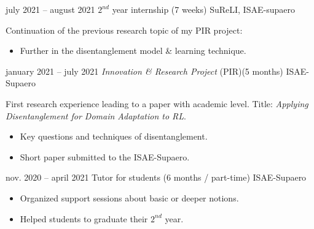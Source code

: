 \documentclass[
    a4paper,
]{fortysecondscv}
\begin{document}
\begin{cvtable}[4]
{                }
            \cvitem
                {july 2021 -- august 2021}
                {$2^{nd}$ year internship \newline (7 weeks)}
                {SuReLI, ISAE-supaero}
                {
                    Continuation of the previous research topic of my PIR project:
                    \begin{itemize}
                        \item Further in the disentanglement model \& learning technique.
                    \end{itemize}
                }
            \cvitem
                {january 2021 -- july 2021}
                {\textit{Innovation \& Research Project} (PIR)\newline (5 months)}
                {ISAE-Supaero}
                {
                    First research experience leading to a paper with academic level.\newline
                    Title: \textit{Applying Disentanglement for Domain Adaptation to RL}.
                    \begin{itemize}
                        \item Key questions and techniques of disentanglement.
                        \item Short paper submitted to the ISAE-Supaero.
                    \end{itemize}
                }
            \cvitem
                {nov. 2020 -- april 2021}
                {Tutor for students \newline (6 months / part-time)}
                {ISAE-Supaero}
                {
                    \begin{itemize}
                        \item Organized support sessions about basic or deeper notions.
                        \item Helped students to graduate their $2^{nd}$ year.
                    \end{itemize}
                }
        \end{cvtable}
\end{document}
